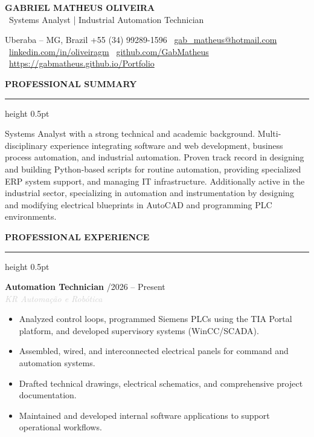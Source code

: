 \documentclass[10pt,a4paper]{article}
\newcommand{\cvsection}[1]{
    \vspace{12pt}
    {\large\textcolor{sectcol}{\textbf{\MakeUppercase{#1}}}}
    \vspace{2pt}
    \hrule height 0.5pt \relax
    \vspace{6pt}
}
\newcommand{\cvevent}[4]{
    \noindent \textbf{#2} \hfill \textcolor{sectcol}{\small \faCalendar* #1} \\
    \noindent \textit{\textcolor{lightgray}{#3}} \vspace{4pt} \\
    {#4} \vspace{8pt}
}
\begin{document}
\begin{center}
    {\Huge \textbf{GABRIEL MATHEUS OLIVEIRA}} \\
    \vspace{6pt}
    {\color{sectcol} \large \faCode \ Systems Analyst | Industrial Automation Technician} \\
    \vspace{10pt}
    
    \small
    \faMapMarker* Uberaba -- MG, Brazil \quad 
    \faPhone* +55 (34) 99289-1596 \quad 
    \faEnvelope \ \href{mailto:gab_matheus@hotmail.com}{gab\_matheus@hotmail.com} \\
    \vspace{4pt}
    \faLinkedin \ \href{https://linkedin.com/in/oliveiragm}{linkedin.com/in/oliveiragm} \quad 
    \faGithub \ \href{https://github.com/GabMatheus}{github.com/GabMatheus} \quad 
    \faGlobe \ \href{https://gabmatheus.github.io/Portfolio/}{https://gabmatheus.github.io/Portfolio}
\end{center}

\cvsection{Professional Summary}
Systems Analyst with a strong technical and academic background. Multi-disciplinary experience integrating software and web development, business process automation, and industrial automation. Proven track record in designing and building Python-based scripts for routine automation, providing specialized ERP system support, and managing IT infrastructure. Additionally active in the industrial sector, specializing in automation and instrumentation by designing and modifying electrical blueprints in AutoCAD and programming PLC environments.

\cvsection{Professional Experience}

\cvevent{03/2026 – Present}{Automation Technician}{KR Automação e Robótica}{
\begin{itemize}
    \item Analyzed control loops, programmed Siemens PLCs using the TIA Portal platform, and developed supervisory systems (WinCC/SCADA).
    \item Assembled, wired, and interconnected electrical panels for command and automation systems.
    \item Drafted technical drawings, electrical schematics, and comprehensive project documentation.
    \item Maintained and developed internal software applications to support operational workflows.
\end{itemize}
}
\end{document}
